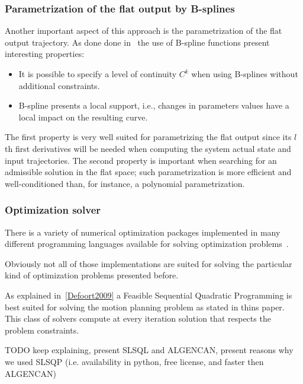 \documentclass[eprint]{actapoly}
\begin{document}
\subsubsection{Parametrization of the flat output by B-splines}

Another important aspect of this approach is the parametrization of 
the flat output trajectory. As done done in~\cite{milam2003} the use
of B-spline functions present interesting properties:


\begin{itemize}


 \item It is possible to specify a level of continuity $C^k$ when using B-splines without
 additional constraints.
 
 \item B-spline presents a local support, i.e., changes in parameters values have a local
 impact on the resulting curve.
 
 
\end{itemize}

The first property is very well suited for parametrizing the flat output since
its $l$th first derivatives will be needed when computing the system actual state
and input trajectories. The second property is important when searching for an
admissible solution in the flat space; such parametrization is more efficient
and well-conditioned than, for instance, a polynomial parametrization.

\subsubsection{Optimization solver}

There is a variety of numerical optimization packages implemented in many different programming languages available for solving optimization problems~\cite{pyopt-paper}.

Obviously not all of those implementations are suited for solving
the particular kind of optimization problems presented before.

As explained in~\ref{Defoort2009} a Feasible Sequential Quadratic Programming is best suited for solving the motion
planning problem as stated in thins paper. 
This class of solvers compute at every iteration solution
that respects the problem constraints.

TODO keep explaining, present SLSQL and ALGENCAN, present reasons why we used SLSQP (i.e. availability in python, free license, and faster then ALGENCAN)
\end{document}
